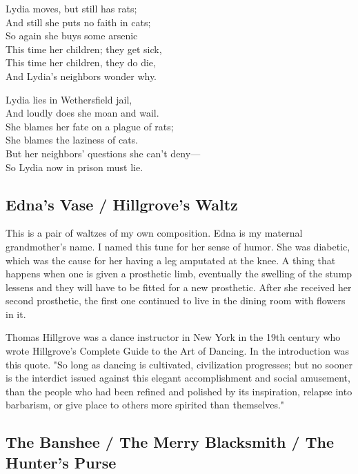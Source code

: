\documentclass[9pt,letterpaper]{article}
\begin{document}
{\hfill

\noindent Lydia moves, but still has rats; \\
And still she puts no faith in cats; \\
So again she buys some arsenic \\
This time her children; they get sick, \\
This time her children, they do die, \\
And Lydia’s neighbors wonder why. \\

\hfill

\noindent Lydia lies in Wethersfield jail, \\
And loudly does she moan and wail. \\
She blames her fate on a plague of rats; \\
She blames the laziness of cats. \\
But her neighbors’ questions she can’t deny— \\
So Lydia now in prison must lie. \\

\subsection{Edna's Vase / Hillgrove's Waltz}

This is a pair of waltzes of my own composition. Edna is my maternal grandmother's name. I named this tune for her sense of humor. She was diabetic, which was the cause for her having a leg amputated at the knee. A thing that happens when one is given a prosthetic limb, eventually the swelling of the stump lessens and they will have to be fitted for a new prosthetic. After she received her second prosthetic, the first one continued to live in the dining room with flowers in it.

Thomas Hillgrove was a dance instructor in New York in the 19th century who wrote Hillgrove's Complete Guide to the Art of Dancing. In the introduction was this quote. "So long as dancing is cultivated, civilization progresses; but no sooner is the interdict issued against this elegant accomplishment and social amusement, than the people who had been refined and polished by its inspiration, relapse into barbarism, or give place to others more spirited than themselves."

\subsection{The Banshee / The Merry Blacksmith / The Hunter's Purse}

}
\end{document}
